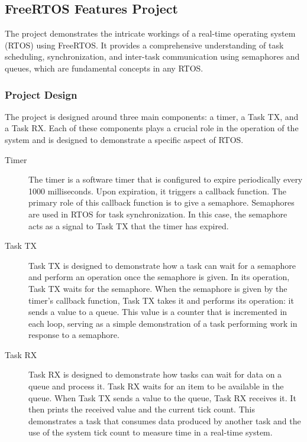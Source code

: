 \subsection{FreeRTOS Features Project}

The project demonstrates the intricate workings of a real-time operating system (RTOS) using FreeRTOS. It provides a comprehensive understanding of task scheduling, synchronization, and inter-task communication using semaphores and queues, which are fundamental concepts in any RTOS.

\subsubsection{Project Design}

The project is designed around three main components: a timer, a Task TX, and a Task RX. Each of these components plays a crucial role in the operation of the system and is designed to demonstrate a specific aspect of RTOS.

\begin{description}
\item[Timer] The timer is a software timer that is configured to expire periodically every 1000 milliseconds. Upon expiration, it triggers a callback function. The primary role of this callback function is to give a semaphore. Semaphores are used in RTOS for task synchronization. In this case, the semaphore acts as a signal to Task TX that the timer has expired.
\item[Task TX] Task TX is designed to demonstrate how a task can wait for a semaphore and perform an operation once the semaphore is given. In its operation, Task TX waits for the semaphore. When the semaphore is given by the timer's callback function, Task TX takes it and performs its operation: it sends a value to a queue. This value is a counter that is incremented in each loop, serving as a simple demonstration of a task performing work in response to a semaphore.
\item[Task RX] Task RX is designed to demonstrate how tasks can wait for data on a queue and process it. Task RX waits for an item to be available in the queue. When Task TX sends a value to the queue, Task RX receives it. It then prints the received value and the current tick count. This demonstrates a task that consumes data produced by another task and the use of the system tick count to measure time in a real-time system.
\end{description}

